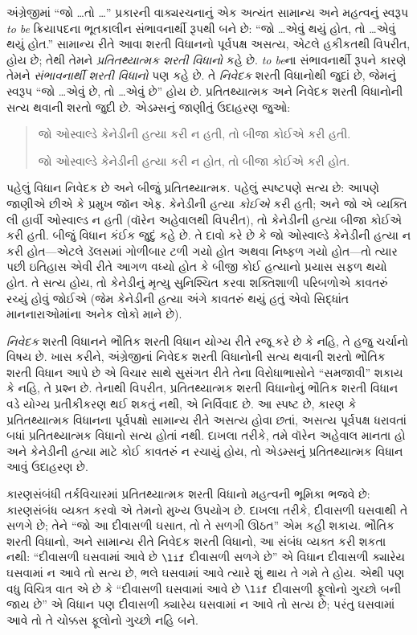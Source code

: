 \documentclass[../../../include/open-logic-section]{subfiles}
\begin{document}


અંગ્રેજીમાં ``જો \dots તો \dots'' પ્રકારની વાક્યરચનાનું એક અત્યંત
સામાન્ય અને મહત્વનું સ્વરૂપ \emph{to be} ક્રિયાપદના ભૂતકાલીન
સંભાવનાર્થી રૂપથી બને છે: ``જો \dots એવું થયું હોત, તો \dots એવું
થયું હોત.'' સામાન્ય રીતે આવા શરતી વિધાનનો પૂર્વપક્ષ અસત્ય, એટલે
હકીકતથી વિપરીત, હોય છે; તેથી તેમને \emph{પ્રતિતથ્યાત્મક શરતી
  વિધાનો} કહે છે. \emph{to be}ના સંભાવનાર્થી રૂપને કારણે તેમને
\emph{સંભાવનાર્થી શરતી વિધાનો} પણ કહે છે. તે \emph{નિવેદક} શરતી
વિધાનોથી જુદાં છે, જેમનું સ્વરૂપ ``જો \dots એવું છે, તો \dots એવું
છે'' હોય છે. પ્રતિતથ્યાત્મક અને નિવેદક શરતી વિધાનોની સત્ય થવાની
શરતો જુદી છે. એડમ્સનું જાણીતું ઉદાહરણ જુઓ:
\begin{quote}
  જો ઓસ્વાલ્ડે કેનેડીની હત્યા કરી ન હતી, તો બીજા કોઈએ કરી હતી.
  
  જો ઓસ્વાલ્ડે કેનેડીની હત્યા કરી ન હોત, તો બીજા કોઈએ કરી હોત.
\end{quote}
પહેલું વિધાન નિવેદક છે અને બીજું પ્રતિતથ્યાત્મક. પહેલું સ્પષ્ટપણે
સત્ય છે: આપણે જાણીએ છીએ કે પ્રમુખ જૉન એફ. કેનેડીની હત્યા
\emph{કોઈએ} કરી હતી; અને જો એ વ્યક્તિ લી હાર્વી ઓસ્વાલ્ડ ન હતી
(વૉરેન અહેવાલથી વિપરીત), તો કેનેડીની હત્યા બીજા કોઈએ કરી હતી. બીજું
વિધાન કંઈક જુદું કહે છે. તે દાવો કરે છે કે જો ઓસ્વાલ્ડે કેનેડીની હત્યા
ન કરી હોત---એટલે ડૅલસમાં ગોળીબાર ટળી ગયો હોત અથવા નિષ્ફળ ગયો
હોત---તો ત્યાર પછી ઇતિહાસ એવી રીતે આગળ વધ્યો હોત કે બીજી કોઈ
હત્યાનો પ્રયાસ સફળ થયો હોત. તે સત્ય હોય, તો કેનેડીનું મૃત્યુ
સુનિશ્ચિત કરવા શક્તિશાળી પરિબળોએ કાવતરું રચ્યું હોવું જોઈએ (જેમ
કેનેડીની હત્યા અંગે કાવતરું થયું હતું એવો સિદ્ધાંત માનનારાઓમાંના
અનેક લોકો માને છે).

\emph{નિવેદક} શરતી વિધાનને ભૌતિક શરતી વિધાન યોગ્ય રીતે રજૂ કરે છે
કે નહિ, તે હજુ ચર્ચાનો વિષય છે. ખાસ કરીને, અંગ્રેજીનાં નિવેદક શરતી
વિધાનોની સત્ય થવાની શરતો ભૌતિક શરતી વિધાન આપે છે એ વિચાર સાથે
સુસંગત રીતે તેના વિરોધાભાસોને ``સમજાવી'' શકાય કે નહિ, તે પ્રશ્ન છે.
તેનાથી વિપરીત, પ્રતિતથ્યાત્મક શરતી વિધાનોનું ભૌતિક શરતી વિધાન વડે
યોગ્ય પ્રતીકીકરણ થઈ શકતું નથી, એ નિર્વિવાદ છે. આ સ્પષ્ટ છે, કારણ કે
પ્રતિતથ્યાત્મક વિધાનના પૂર્વપક્ષો સામાન્ય રીતે અસત્ય હોવા છતાં,
અસત્ય પૂર્વપક્ષ ધરાવતાં બધાં પ્રતિતથ્યાત્મક વિધાનો સત્ય હોતાં નથી.
દાખલા તરીકે, તમે વૉરેન અહેવાલ માનતા હો અને કેનેડીની હત્યા માટે કોઈ
કાવતરું ન રચાયું હોય, તો એડમ્સનું પ્રતિતથ્યાત્મક
વિધાન આવું ઉદાહરણ છે.

કારણસંબંધી તર્કવિચારમાં પ્રતિતથ્યાત્મક શરતી વિધાનો મહત્વની ભૂમિકા
ભજવે છે: કારણસંબંધ વ્યક્ત કરવો એ તેમનો મુખ્ય ઉપયોગ છે. દાખલા તરીકે,
દીવાસળી ઘસવાથી તે સળગે છે; તેને ``જો આ દીવાસળી ઘસાત, તો તે સળગી
ઊઠત'' એમ કહી શકાય. ભૌતિક શરતી વિધાનો, અને સામાન્ય રીતે નિવેદક
શરતી વિધાનો, આ સંબંધ વ્યક્ત કરી શકતા નથી: ``દીવાસળી ઘસવામાં આવે છે
$\lif$ દીવાસળી સળગે છે'' એ વિધાન દીવાસળી ક્યારેય ઘસવામાં ન આવે
તો સત્ય છે, ભલે ઘસવામાં આવે ત્યારે શું થાય તે ગમે તે હોય. એથી પણ
વધુ વિચિત્ર વાત એ છે કે ``દીવાસળી ઘસવામાં આવે છે $\lif$ દીવાસળી
ફૂલોનો ગુચ્છો બની જાય છે'' એ વિધાન પણ દીવાસળી ક્યારેય ઘસવામાં ન
આવે તો સત્ય છે; પરંતુ ઘસવામાં આવે તો તે ચોક્કસ ફૂલોનો ગુચ્છો નહિ
બને.
\end{document}

